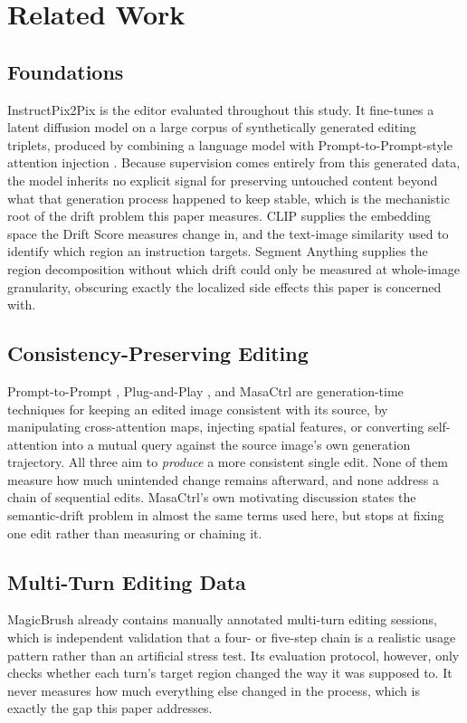 \vspace{-4pt}
\section{Related Work}

\subsection{Foundations}
InstructPix2Pix \cite{ref_ip2p} is the editor evaluated throughout this study. It fine-tunes a latent diffusion model \cite{ref_ldm} on a large corpus of synthetically generated editing triplets, produced by combining a language model with Prompt-to-Prompt-style attention injection \cite{ref_p2p}. Because supervision comes entirely from this generated data, the model inherits no explicit signal for preserving untouched content beyond what that generation process happened to keep stable, which is the mechanistic root of the drift problem this paper measures. CLIP \cite{ref_clip} supplies the embedding space the Drift Score measures change in, and the text-image similarity used to identify which region an instruction targets. Segment Anything \cite{ref_sam} supplies the region decomposition without which drift could only be measured at whole-image granularity, obscuring exactly the localized side effects this paper is concerned with.

\subsection{Consistency-Preserving Editing}
Prompt-to-Prompt \cite{ref_p2p}, Plug-and-Play \cite{ref_pnp}, and MasaCtrl \cite{ref_masactrl} are generation-time techniques for keeping an edited image consistent with its source, by manipulating cross-attention maps, injecting spatial features, or converting self-attention into a mutual query against the source image's own generation trajectory. All three aim to \textit{produce} a more consistent single edit. None of them measure how much unintended change remains afterward, and none address a chain of sequential edits. MasaCtrl's own motivating discussion states the semantic-drift problem in almost the same terms used here, but stops at fixing one edit rather than measuring or chaining it.

\subsection{Multi-Turn Editing Data}
MagicBrush \cite{ref_magicbrush} already contains manually annotated multi-turn editing sessions, which is independent validation that a four- or five-step chain is a realistic usage pattern rather than an artificial stress test. Its evaluation protocol, however, only checks whether each turn's target region changed the way it was supposed to. It never measures how much everything else changed in the process, which is exactly the gap this paper addresses.

